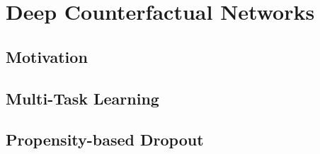 %

\chapter{\label{ch:3-DCNs}Deep Counterfactual Networks} 


\section{Motivation}

\section{Multi-Task Learning}

\section{Propensity-based Dropout}
